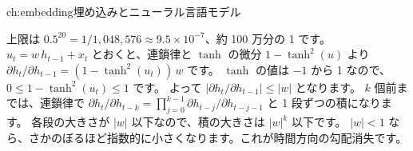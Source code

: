 \begin{answers}{ch:embedding}{埋め込みとニューラル言語モデル}
\item 上限は $0.5^{20}=1/1{,}048{,}576\approx9.5\times10^{-7}$、約 100 万分の 1 です。
$u_t=w\,h_{t-1}+x_t$ とおくと、連鎖律と $\tanh$ の微分 $1-\tanh^2(u)$ より
$\partial h_t/\partial h_{t-1}=(1-\tanh^2(u_t))\,w$ です。
$\tanh$ の値は $-1$ から 1 なので、$0\le1-\tanh^2(u_t)\le1$ です。
よって $\left|\partial h_t/\partial h_{t-1}\right|\le|w|$ となります。
$k$ 個前までは、連鎖律で
$\partial h_t/\partial h_{t-k}=\prod_{j=0}^{k-1}\partial h_{t-j}/\partial h_{t-j-1}$ と 1 段ずつの積になります。
各段の大きさが $|w|$ 以下なので、積の大きさは $|w|^k$ 以下です。
$|w|<1$ なら、さかのぼるほど指数的に小さくなります。これが時間方向の勾配消失です。
\end{answers}
